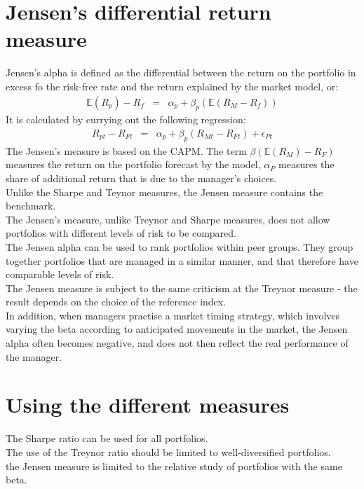 \section{Jensen's differential return measure}
Jensen's alpha is defined as the differential between the return on the portfolio in excess fo the risk-free rate and the return explained by the market model, or:
\begin{eqnarray}
	\mathbb{E}(R_{p}) - R_{f} &=& \alpha_{p} + \beta_{p}(\mathbb{E}(R_{M} - R_{f}))
\end{eqnarray}
It is calculated by currying out the following regression:
\begin{eqnarray}
	R_{pt} - R_{Ft} &=& \alpha_{p} + \beta_{p}(R_{Mt} - R_{Ft}) + \epsilon_{Pt}
\end{eqnarray}
The Jensen's measure is based on the CAPM. The term $\beta(\mathbb{E}(R_{M}) - R_{F})$ measures the return on the portfolio forecast by the model, $\alpha_{P}$ measures the share of additional return that is due to the manager's choices.\\
Unlike the Sharpe and Teynor measures, the Jensen measure contains the benchmark.\\
The Jensen's measure, unlike Treynor and Sharpe measures, does not allow portfolios with different levels of risk to be compared.\\
The Jensen alpha can be used to rank portfolios within peer groups. They group together portfolios that are managed in a similar manner, and that therefore have comparable levels of risk.\\
The Jensen measure is subject to the same criticism at the Treynor measure - the result depends on the choice of the reference index.\\
In addition, when managers practise a market timing strategy, which involves varying the beta according to anticipated movements in the market, the Jensen alpha often becomes negative, and does not then reflect the real performance of the manager.


\section{Using the different measures}
The Sharpe ratio can be used for all portfolios.\\
The use of the Treynor ratio should be limited to well-diversified portfolios.\\
the Jensen measure is limited to the relative study of portfolios with the same beta.\\


